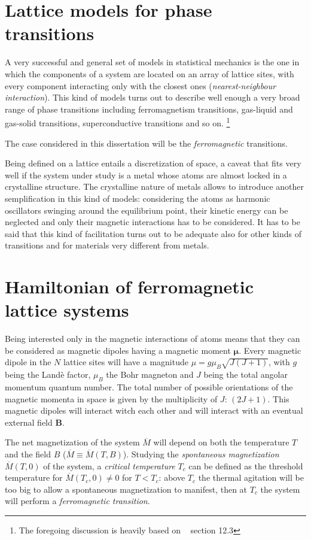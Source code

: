 \section{Lattice models for phase transitions}

A very successful and general set of models in statistical mechanics is the
one in which the components of a system are located on an array of lattice sites,
with every component interacting only with the closest ones
(\emph{nearest-neighbour interaction}).
This kind of models turns out to describe well enough a very broad range of phase 
transitions including ferromagnetism transitions, gas-liquid and gas-solid 
transitions, superconductive transitions and so on. \footnote{The foregoing
discussion is heavily based on ~\textcite{pathria1972statistical} section 12.3}

The case considered in this dissertation will be the \emph{ferromagnetic}
transitions.

Being defined on a lattice entails a discretization of space, a caveat 
that fits very well if the system under study is a metal whose atoms are almost 
locked in a crystalline structure. The crystalline nature of metals allows to
introduce another semplification in this kind of models: considering the atoms
as harmonic oscillators swinging around the equilibrium point, their kinetic energy can 
be neglected and only their magnetic interactions has to be considered. 
It has to be said that this kind of facilitation turns out to be 
adequate also for other kinds of transitions and for materials very different 
from metals.

\section{Hamiltonian of ferromagnetic lattice systems}

Being interested only in the magnetic interactions of atoms means that they can be considered as 
magnetic dipoles having a magnetic moment $\mathbf{\mu}$. Every magnetic dipole
in the $N$ lattice sites will have a magnitude $\mu = g \mu_B \sqrt{J(J+1)}$, 
with $g$ being the Landè factor, $\mu_B$ the Bohr magneton and $J$ being the
total angolar momentum quantum number. The total number of possible orientations of
the magnetic momenta in space is given by the multiplicity of $J$: $(2J+1)$. This 
magnetic dipoles will interact witch each other and will interact with an eventual
external field $\mathbf{B}$.

The net magnetization of the system $\overline{M}$ will depend on both the 
temperature $T$ and the field $B$ ($\overline{M} \equiv \overline{M}(T,B)$). 
Studying the \emph{spontaneous magnetization} $\overline{M}(T,0)$ of the system,
a \emph{critical temperature} $T_c$ can be defined as the threshold temperature
for $\overline{M}(T_c,0) \neq 0$ for $T < T_c$: above $T_c$ the thermal agitation 
will be too big to allow a spontaneous magnetization to manifest, then at $T_c$ the
system will perform a \emph{ferromagnetic transition}.

